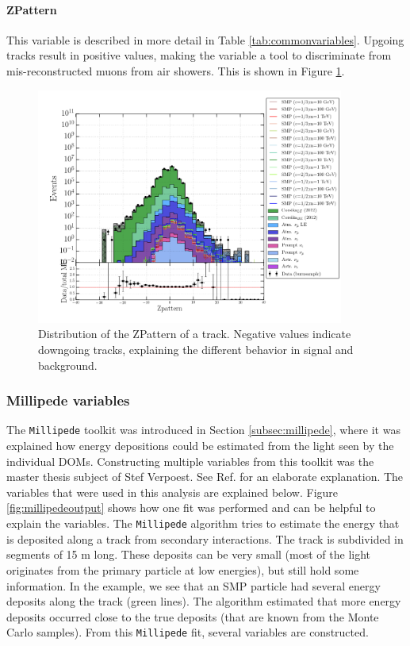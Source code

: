 \paragraph{ZPattern}
This variable is described in more detail in Table \ref{tab:commonvariables}. Upgoing tracks result in positive values, making the variable a tool to discriminate from mis-reconstructed muons from air showers. This is shown in Figure \ref{fig:commonvariableszpattern}.

\begin{figure}
\centering
\includegraphics[width = 0.9\textwidth]{chapter8/img/1D_stack_zpattern.png}
\caption{Distribution of the ZPattern of a track. Negative values indicate downgoing tracks, explaining the different behavior in signal and background.}
\label{fig:commonvariableszpattern}
\end{figure}


\subsubsection{Millipede variables}
The \texttt{Millipede} toolkit was introduced in Section \ref{subsec:millipede}, where it was explained how energy depositions could be estimated from the light seen by the individual DOMs. Constructing multiple variables from this toolkit was the master thesis subject of Stef Verpoest. See Ref. \cite{steffthesis} for an elaborate explanation. The variables that were used in this analysis are explained below. Figure \ref{fig:millipedeoutput} shows how one fit was performed and can be helpful to explain the variables. The \texttt{Millipede} algorithm tries to estimate the energy that is deposited along a track from secondary interactions. The track is subdivided in segments of 15 m long. These deposits can be very small (most of the light originates from the primary particle at low energies), but still hold some information. In the example, we see that an SMP particle had several energy deposits along the track (green lines). The algorithm estimated that more energy deposits occurred close to the true deposits (that are known from the Monte Carlo samples). From this \texttt{Millipede} fit, several variables are constructed.

